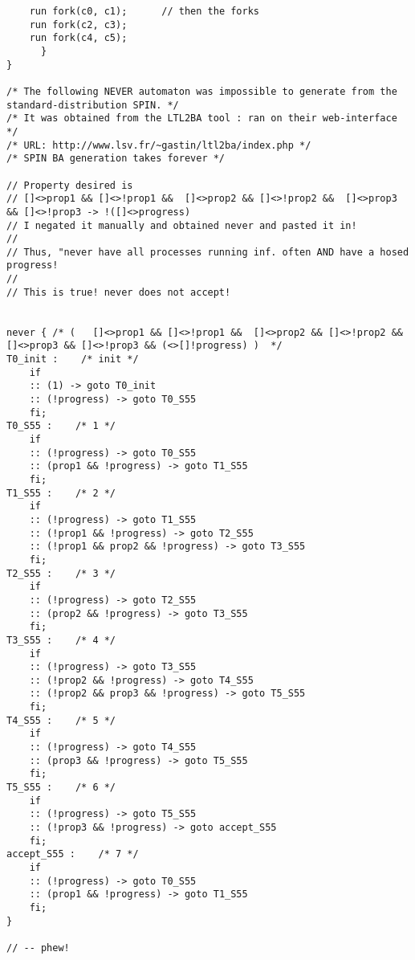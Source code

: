 \documentclass[11pt]{article}
\begin{document}
\begin{tiny}
\begin{verbatim}
	run fork(c0, c1);      // then the forks
	run fork(c2, c3);
	run fork(c4, c5);
      }
}

/* The following NEVER automaton was impossible to generate from the standard-distribution SPIN. */
/* It was obtained from the LTL2BA tool : ran on their web-interface */
/* URL: http://www.lsv.fr/~gastin/ltl2ba/index.php */
/* SPIN BA generation takes forever */

// Property desired is
// []<>prop1 && []<>!prop1 &&  []<>prop2 && []<>!prop2 &&  []<>prop3 && []<>!prop3 -> !([]<>progress)  
// I negated it manually and obtained never and pasted it in!
//
// Thus, "never have all processes running inf. often AND have a hosed progress!
//
// This is true! never does not accept!


never { /* (   []<>prop1 && []<>!prop1 &&  []<>prop2 && []<>!prop2 &&  []<>prop3 && []<>!prop3 && (<>[]!progress) )  */
T0_init :    /* init */
	if
	:: (1) -> goto T0_init
	:: (!progress) -> goto T0_S55
	fi;
T0_S55 :    /* 1 */
	if
	:: (!progress) -> goto T0_S55
	:: (prop1 && !progress) -> goto T1_S55
	fi;
T1_S55 :    /* 2 */
	if
	:: (!progress) -> goto T1_S55
	:: (!prop1 && !progress) -> goto T2_S55
	:: (!prop1 && prop2 && !progress) -> goto T3_S55
	fi;
T2_S55 :    /* 3 */
	if
	:: (!progress) -> goto T2_S55
	:: (prop2 && !progress) -> goto T3_S55
	fi;
T3_S55 :    /* 4 */
	if
	:: (!progress) -> goto T3_S55
	:: (!prop2 && !progress) -> goto T4_S55
	:: (!prop2 && prop3 && !progress) -> goto T5_S55
	fi;
T4_S55 :    /* 5 */
	if
	:: (!progress) -> goto T4_S55
	:: (prop3 && !progress) -> goto T5_S55
	fi;
T5_S55 :    /* 6 */
	if
	:: (!progress) -> goto T5_S55
	:: (!prop3 && !progress) -> goto accept_S55
	fi;
accept_S55 :    /* 7 */
	if
	:: (!progress) -> goto T0_S55
	:: (prop1 && !progress) -> goto T1_S55
	fi;
}

// -- phew!

  \end{verbatim}
\end{tiny}
\end{document}

